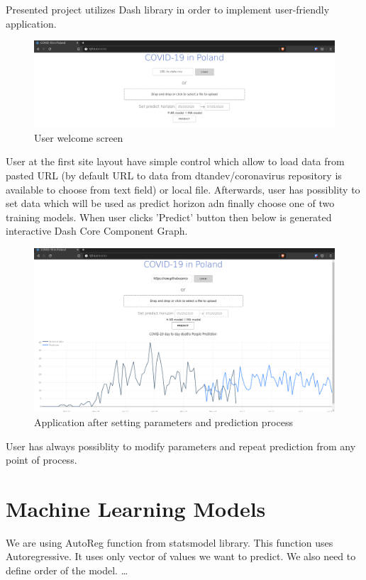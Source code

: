 \documentclass[conference]{IEEEtran}
\begin{document}
Presented project utilizes Dash library in order to implement user-friendly application.
\begin{figure}[h!]
    \includegraphics[width=\linewidth]{images/gui1.png}
    \caption{User welcome screen}
    \label{fig:gui1}
\end{figure}
\newline
User at the first site layout have simple control which allow to load data from pasted URL (by default URL to data from dtandev/coronavirus repository is available to choose from text field) or local file.
Afterwards, user has possiblity to set data which will be used as predict horizon adn finally choose one of two training models.
\newline
When user clicks 'Predict' button then below is generated interactive Dash Core Component Graph.
\begin{figure}[h!]
    \includegraphics[width=\linewidth]{images/gui2.png}
    \caption{Application after setting parameters and prediction process}
    \label{fig:gui2}
\end{figure}
\newline
User has always possiblity to modify parameters and repeat prediction from any point of process.

\section{Machine Learning Models}
We are using AutoReg function from statsmodel library. This function uses Autoregressive. It uses only vector of values we want to predict.
 We also need to define order of the model.
\dots
\end{document}
